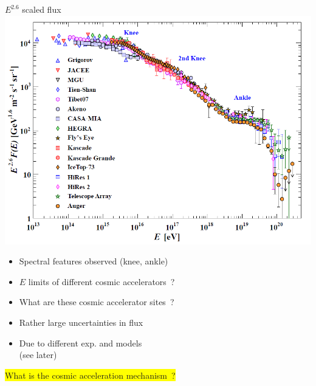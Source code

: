 \Tr
\vspace*{1.5cm}
\begin{center}
{\blue $E^{2.6}$ scaled flux}\\[5mm]
\includegraphics[keepaspectratio,width=13.5cm]{cr-all-scaled26}
\end{center}

\newpage

\vspace*{3cm}
\begin{itemize}
\item Spectral features observed (knee, ankle)
\item[] $E$ limits of different cosmic accelerators~?
\item[] What are these cosmic accelerator sites~?
\item Rather large uncertainties in flux 
\item[] Due to different exp. and models\\
        (see later)
\end{itemize}
%
\colorbox{yellow}{What is the cosmic acceleration mechanism~?}

